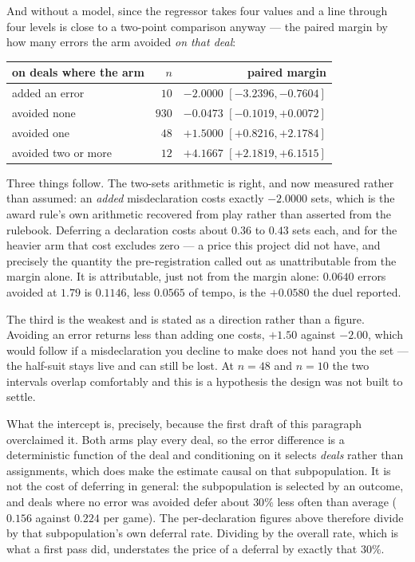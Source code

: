 \documentclass[11pt,letterpaper]{article}
\begin{document}
\noindent And without a model, since the regressor takes four values and a
line through four levels is close to a two-point comparison anyway --- the
paired margin by how many errors the arm avoided \emph{on that deal}:

\begin{center}
\small
\begin{tabular}{lrr}
\toprule
on deals where the arm & $n$ & paired margin \\
\midrule
added an error & $10$ & $\mathbf{-2.0000}$ $[-3.2396, -0.7604]$ \\
avoided none & $930$ & $-0.0473$ $[-0.1019, +0.0072]$ \\
avoided one & $48$ & $+1.5000$ $[+0.8216, +2.1784]$ \\
avoided two or more & $12$ & $+4.1667$ $[+2.1819, +6.1515]$ \\
\bottomrule
\end{tabular}
\end{center}

Three things follow. The two-sets arithmetic is right, and now measured
rather than assumed: an \emph{added} misdeclaration costs exactly $-2.0000$
sets, which is the award rule's own arithmetic recovered from play rather than
asserted from the rulebook. Deferring a declaration costs about $0.36$ to
$0.43$ sets each, and for the heavier arm that cost excludes zero --- a price
this project did not have, and precisely the quantity the pre-registration
called out as unattributable from the margin alone. It is attributable, just
not from the margin alone: $0.0640$ errors avoided at $1.79$ is $0.1146$,
less $0.0565$ of tempo, is the $+0.0580$ the duel reported.

The third is the weakest and is stated as a direction rather than a figure.
Avoiding an error returns less than adding one costs, $+1.50$ against $-2.00$,
which would follow if a misdeclaration you decline to make does not hand you
the set --- the half-suit stays live and can still be lost. At $n = 48$ and
$n = 10$ the two intervals overlap comfortably and this is a hypothesis the
design was not built to settle.

What the intercept is, precisely, because the first draft of this paragraph
overclaimed it. Both arms play every deal, so the error difference is a
deterministic function of the deal and conditioning on it selects \emph{deals}
rather than assignments, which does make the estimate causal on that
subpopulation. It is not the cost of deferring in general: the subpopulation is
selected by an outcome, and deals where no error was avoided defer about
$30\%$ less often than average ($0.156$ against $0.224$ per game). The
per-declaration figures above therefore divide by that subpopulation's own
deferral rate. Dividing by the overall rate, which is what a first pass did,
understates the price of a deferral by exactly that $30\%$.
\end{document}
